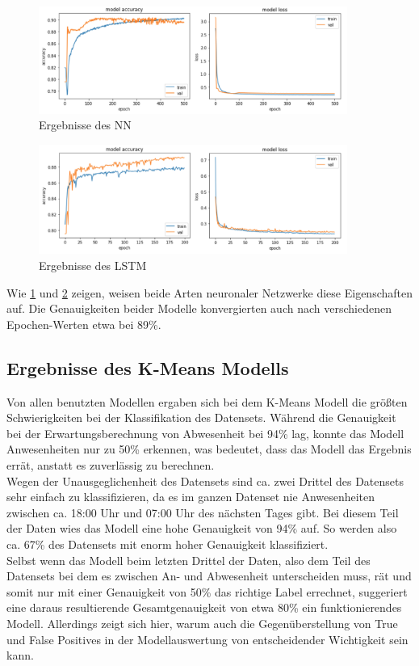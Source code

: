 \begin{figure}[h]
    \centering
    \includegraphics[width=0.9\textwidth]{pic/eval_NN.png}
    \caption{Ergebnisse des NN}
    \label{fig:eval_NN}
\end{figure}

\begin{figure}[h]
    \centering
    \includegraphics[width=0.9\textwidth]{pic/eval_LSTM.png}
    \caption{Ergebnisse des LSTM}
    \label{fig:eval_LSTM}
\end{figure}

Wie \ref{fig:eval_NN} und \ref{fig:eval_LSTM} zeigen, weisen beide Arten neuronaler Netzwerke diese Eigenschaften auf. Die Genauigkeiten beider Modelle
konvergierten auch nach verschiedenen Epochen-Werten etwa bei 89\%.

\subsection{Ergebnisse des K-Means Modells}\label{KMeans}
Von allen benutzten Modellen ergaben sich bei dem K-Means Modell die größten Schwierigkeiten bei der 
Klassifikation des Datensets. 
Während die Genauigkeit bei der Erwartungsberechnung von Abwesenheit bei 94\% lag, konnte das
Modell Anwesenheiten nur zu 50\% erkennen, was bedeutet, dass das Modell das Ergebnis errät, anstatt
es zuverlässig zu berechnen. \\
Wegen der Unausgeglichenheit des Datensets sind ca. zwei Drittel des Datensets sehr einfach zu 
klassifizieren, da es im ganzen Datenset nie Anwesenheiten zwischen ca. 18:00 Uhr und 07:00 Uhr des nächsten 
Tages gibt. Bei diesem Teil der Daten wies das Modell eine hohe Genauigkeit von 94\% auf. So werden also 
ca. 67\% des Datensets mit enorm hoher Genauigkeit klassifiziert.\\
Selbst wenn das Modell beim letzten Drittel der Daten, also dem Teil des Datensets bei dem es zwischen
An- und Abwesenheit unterscheiden muss, rät und somit nur mit einer Genauigkeit von 50\% das richtige Label 
errechnet, suggeriert eine daraus resultierende Gesamtgenauigkeit von etwa 80\% ein funktionierendes Modell.
Allerdings zeigt sich hier, warum auch die Gegenüberstellung von True und False Positives in der 
Modellauswertung von entscheidender Wichtigkeit sein kann.\\

